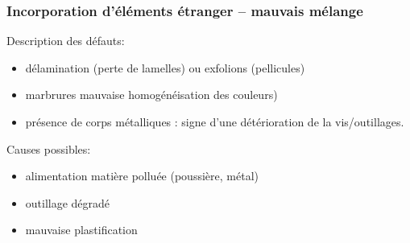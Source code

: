 \documentclass[11pt,oneside]{article}
\begin{document}
 
%     
%           
%           
         \subsubsection{Incorporation d’éléments étranger – mauvais mélange}
         Description des défauts: 
\begin{itemize}
 \item délamination (perte de lamelles) ou exfolions (pellicules) 
 \item marbrures mauvaise homogénéisation des couleurs) 
 \item présence de corps métalliques : signe d’une détérioration de la
vis/outillages. 
\end{itemize}

        Causes possibles: 
\begin{itemize}
 \item alimentation matière polluée (poussière, métal) 
 \item outillage dégradé 
 \item mauvaise plastification 
\end{itemize}
\end{document}
